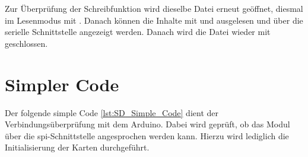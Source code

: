 Zur Überprüfung der Schreibfunktion wird dieselbe Datei erneut geöffnet, diesmal im Lesenmodus mit . Danach können die Inhalte mit  und  ausgelesen und über die serielle Schnittstelle angezeigt werden. Danach wird die Datei wieder mit  geschlossen.

{
     \label{lst:SDCardExample}
}

%

\section{Simpler Code}

Der folgende simple Code \ref{lst:SD_Simple_Code} dient der Verbindungsüberprüfung mit dem Arduino. Dabei wird geprüft, ob das Modul über die \acs{spi}-Schnittstelle angesprochen werden kann. Hierzu wird lediglich die Initialisierung der Karten durchgeführt.


{
     \label{lst:SD_Simple_Code}
}



